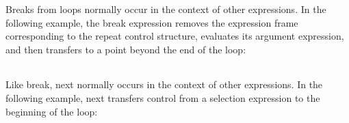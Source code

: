 \begin{noIndex}
\begin{center}
\begin{xtabular}{|m{1.9073598in}|m{2.75596in}|}
\end{xtabular}
\end{center}

Breaks from loops normally occur in the context of other
expressions. In the following example, the break expression removes
the expression frame corresponding to the repeat control structure,
evaluates its argument expression, and then transfers to a point
beyond the end of the loop:

\begin{center}
\tablelasttail{\hline}
\begin{xtabular}{|m{1.9073598in}|m{2.75596in}|}

\end{xtabular}
\end{center}

Like break, next normally occurs in the context of other
expressions. In the following example, next transfers control from a
selection expression to the beginning of the loop:


\end{noIndex}
